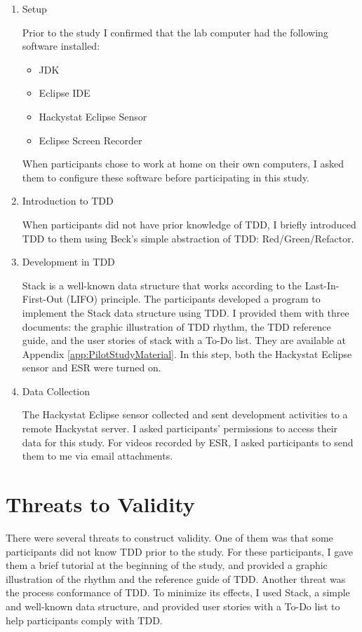 \begin{enumerate}
\item{Setup} 

Prior to the study I confirmed that the lab computer had the following software installed: 
  \begin{itemize}
    \item JDK 
    \item Eclipse IDE 
    \item Hackystat Eclipse Sensor \cite{HackystatSensorInstallation:06}
    \item Eclipse Screen Recorder \cite{esr}
  \end{itemize}
When participants chose to work at home on their own computers, I asked them to configure these software before participating in this study.

\item{Introduction to TDD}

When participants did not have prior knowledge of TDD, I briefly introduced TDD to them using Beck's simple abstraction of TDD: Red/Green/Refactor. 

\item{Development in TDD} 

Stack is a well-known data structure that works according to the Last-In-First-Out (LIFO) principle. The participants developed a program to implement the Stack data structure using TDD. I provided  them with three documents: the graphic illustration of TDD rhythm, the TDD reference guide, and the user stories of stack with a To-Do list. They are available at Appendix \ref{app:PilotStudyMaterial}. In this step, both the Hackystat Eclipse sensor and ESR were turned on.

\item{Data Collection}

The Hackystat Eclipse sensor collected and sent development activities to a remote Hackystat server. I asked participants' permissions to access their data for this study. For videos recorded by ESR, I asked participants to send them to me via email attachments. 

\end{enumerate}

\section{Threats to Validity}
There were several threats to construct validity. One of them was that some participants did not know TDD prior to the study. For these participants, I gave them a brief tutorial at the beginning of the study, and provided a graphic illustration of the rhythm \cite{TDDRhythm} and the reference guide \cite{TDDQuickReference} of TDD. Another threat was the process conformance of TDD. To minimize its effects, I used Stack, a simple and well-known data structure, and provided user stories with a To-Do list to help participants comply with TDD.  

